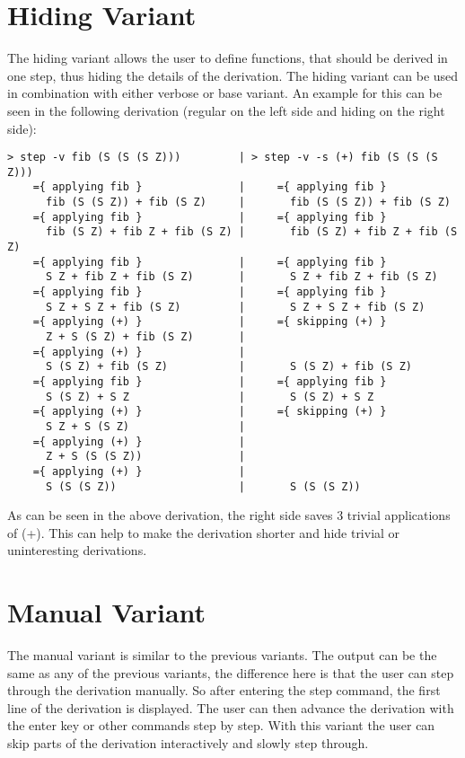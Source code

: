 \section{Hiding Variant}

The hiding variant allows the user to define functions, that should be derived in one step, thus hiding the details of the derivation.
The hiding variant can be used in combination with either verbose or base variant.
An example for this can be seen in the following derivation (regular on the left side and hiding on the right side):

\begin{verbatim}
> step -v fib (S (S (S Z)))         | > step -v -s (+) fib (S (S (S Z)))
    ={ applying fib }               |     ={ applying fib }
      fib (S (S Z)) + fib (S Z)     |       fib (S (S Z)) + fib (S Z)
    ={ applying fib }               |     ={ applying fib }
      fib (S Z) + fib Z + fib (S Z) |       fib (S Z) + fib Z + fib (S Z)
    ={ applying fib }               |     ={ applying fib } 
      S Z + fib Z + fib (S Z)       |       S Z + fib Z + fib (S Z)
    ={ applying fib }               |     ={ applying fib }
      S Z + S Z + fib (S Z)         |       S Z + S Z + fib (S Z)
    ={ applying (+) }               |     ={ skipping (+) }
      Z + S (S Z) + fib (S Z)       |       
    ={ applying (+) }               |
      S (S Z) + fib (S Z)           |       S (S Z) + fib (S Z)
    ={ applying fib }               |     ={ applying fib }
      S (S Z) + S Z                 |       S (S Z) + S Z
    ={ applying (+) }               |     ={ skipping (+) }
      S Z + S (S Z)                 |
    ={ applying (+) }               |
      Z + S (S (S Z))               |
    ={ applying (+) }               |
      S (S (S Z))                   |       S (S (S Z))
\end{verbatim}

As can be seen in the above derivation, the right side saves 3 trivial applications of (+).
This can help to make the derivation shorter and hide trivial or uninteresting derivations.

\section{Manual Variant}

The manual variant is similar to the previous variants.
The output can be the same as any of the previous variants, the difference here is that the user can step through the derivation manually.
So after entering the step command, the first line of the derivation is displayed.
The user can then advance the derivation with the enter key or other commands step by step.
With this variant the user can skip parts of the derivation interactively and slowly step through.

